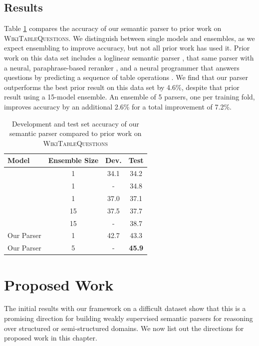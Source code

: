 \subsection{Results}
Table \ref{tab:nnsp_wikitables_results} compares the accuracy of our semantic parser 
to prior work on \textsc{WikiTableQuestions}.
We distinguish between single models and ensembles, as we expect ensembling to 
improve accuracy, but not all prior work has used it.
Prior work on this data set includes a loglinear semantic parser 
\citep{pasupat2015compositional}, that same parser with a neural, paraphrase-based reranker 
\citep{haug2017neural}, and a neural programmer that answers questions by predicting a 
sequence of table operations \citep{Neelakantan2016LearningAN}.  
We find that our parser outperforms the best prior result on this data set by 
4.6\%, despite that prior result using a 15-model ensemble.
An ensemble of 5 parsers, one per training fold, improves accuracy by an 
additional 2.6\% for a total improvement of 7.2\%.
\begin{table}
    \centering
    \begin{tabular}{|l|c|c|c|}
	\hline
        \textbf{Model} & \textbf{Ensemble Size} & \textbf{Dev.} & \textbf{Test} \\
        \hline 
        \cite{Neelakantan2016LearningAN} & 1 & 34.1 & 34.2 \\
        \cite{haug2017neural} & 1 & - & 34.8 \\
        \cite{pasupat2015compositional} & 1 & 37.0 & 37.1 \\
        \cite{Neelakantan2016LearningAN} & 15 & 37.5 & 37.7 \\
        \cite{haug2017neural} & 15 & - & 38.7 \\
        \hline
        Our Parser & 1 & 42.7 & 43.3 \\
        Our Parser & 5 & - & \textbf{45.9} \\
        \hline
    \end{tabular}
    \caption{Development and test set accuracy of our semantic parser compared to prior work on \textsc{WikiTableQuestions}}
    \label{tab:nnsp_wikitables_results}
\end{table}

\section{Proposed Work}
The initial results with our framework on a difficult dataset show that this is a promising direction for building weakly
supervised semantic parsers for reasoning over structured or semi-structured domains. We now list out the directions for
proposed work in this chapter.

